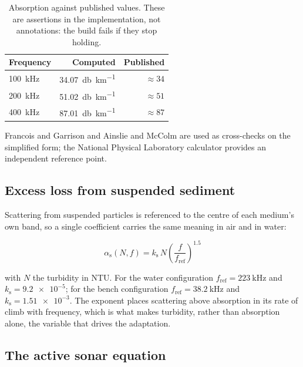\documentclass[11pt,a4paper]{article}
\begin{document}
\begin{table}[htbp]
\centering
\small
\begin{tabular}{lrr}
\toprule
\textbf{Frequency} & \textbf{Computed} & \textbf{Published} \\
\midrule
\SI{100}{\kilo\hertz} & \SI{34.07}{\decibel\per\kilo\metre} & $\approx 34$ \\
\SI{200}{\kilo\hertz} & \SI{51.02}{\decibel\per\kilo\metre} & $\approx 51$ \\
\SI{400}{\kilo\hertz} & \SI{87.01}{\decibel\per\kilo\metre} & $\approx 87$ \\
\bottomrule
\end{tabular}
\caption{Absorption against published values. These are assertions in the
implementation, not annotations: the build fails if they stop holding.}
\end{table}

Francois and Garrison \cite{francois1982} and Ainslie and McColm
\cite{ainslie1998} are used as cross-checks on the simplified form; the
National Physical Laboratory calculator \cite{npl} provides an independent
reference point.

\subsection{Excess loss from suspended sediment}

Scattering from suspended particles is referenced to the centre of each
medium's own band, so a single coefficient carries the same meaning in air and
in water:

\begin{equation}
\alpha_{\text{s}}(N,f) = k_{\text{s}}\,N
  \left(\frac{f}{f_{\text{ref}}}\right)^{1.5}
\label{eq:scatter}
\end{equation}

with $N$ the turbidity in NTU. For the water configuration
$f_{\text{ref}} = \SI{223}{\kilo\hertz}$ and
$k_{\text{s}} = \num{9.2e-5}$; for the bench configuration
$f_{\text{ref}} = \SI{38.2}{\kilo\hertz}$ and $k_{\text{s}} = \num{1.51e-3}$.
The exponent places scattering above absorption in its rate of climb with
frequency, which is what makes turbidity, rather than absorption alone, the
variable that drives the adaptation.

\subsection{The active sonar equation}
\end{document}
